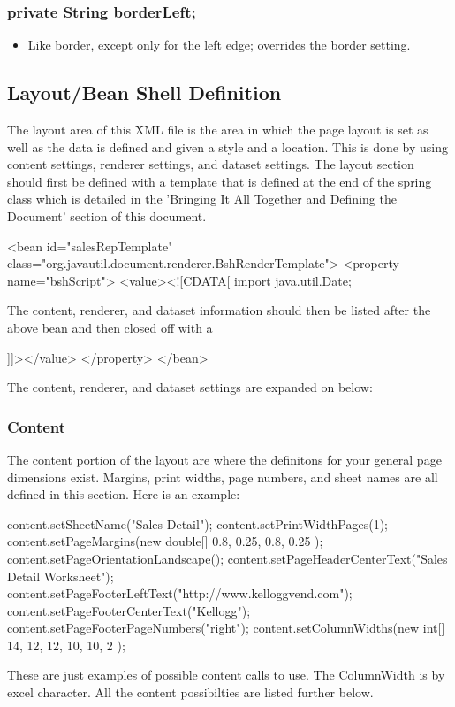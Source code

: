 \documentclass[letterpaper,10pt]{article}
\begin{document}
\subsubsection{private String borderLeft;}
\begin{itemize}
 \item Like border, except only for the left edge; overrides the border setting.
\end{itemize}

\subsection{Layout/Bean Shell Definition}
The layout area of this XML file is the area in which the page layout is set as well as the data is defined and given a style and a location.  This is done by using content settings, renderer settings, and dataset settings.  The layout section should first be defined with a template that is defined at the end of the spring class which is detailed in the 'Bringing It All Together and Defining the Document' section of this document.

\begin{verbatimtab}
	<bean id="salesRepTemplate" class="org.javautil.document.renderer.BshRenderTemplate">
		<property name="bshScript">
			<value><![CDATA[
	import java.util.Date;
\end{verbatimtab}
The content, renderer, and dataset information should then be listed after the above bean and then closed off with a
\begin{verbatimtab}
 	]]></value>
		</property>
	</bean>
\end{verbatimtab}

The content, renderer, and dataset settings are expanded on below:

\subsubsection{Content}
The content portion of the layout are where the definitons for your general page dimensions exist.  Margins, print widths, page numbers, and sheet names are all defined in this section.  Here is an example:

\begin{verbatimtab}
 	content.setSheetName("Sales Detail");
	content.setPrintWidthPages(1);
	content.setPageMargins(new double[] { 0.8, 0.25, 0.8, 0.25 });
	content.setPageOrientationLandscape();
	content.setPageHeaderCenterText("Sales Detail Worksheet");
	content.setPageFooterLeftText("http://www.kelloggvend.com");
	content.setPageFooterCenterText("Kellogg");
	content.setPageFooterPageNumbers("right");
	content.setColumnWidths(new int[] { 14, 12, 12, 10, 10, 2 });
\end{verbatimtab}
These are just examples of possible content calls to use.  The ColumnWidth is by excel character.  All the content possibilties are listed further below.
\end{document}
